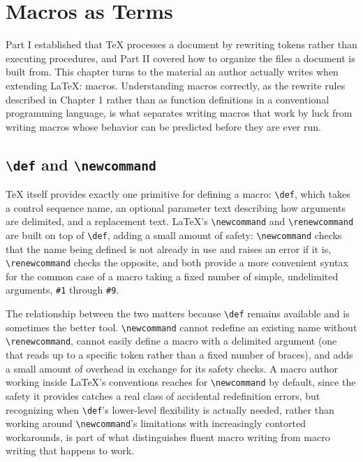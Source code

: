 \hypertarget{chapter-6-macros-as-terms}{%
\chapter{Macros as Terms}\label{chapter-6-macros-as-terms}}

Part I established that TeX processes a document by rewriting tokens rather than executing procedures, and Part II covered how to organize the files a document is built from. This chapter turns to the material an author actually writes when extending LaTeX: macros. Understanding macros correctly, as the rewrite rules described in Chapter 1 rather than as function definitions in a conventional programming language, is what separates writing macros that work by luck from writing macros whose behavior can be predicted before they are ever run.

\hypertarget{def-and-newcommand}{%
\section{\texorpdfstring{\texttt{\textbackslash{}def} and \texttt{\textbackslash{}newcommand}}{\textbackslash def and \textbackslash newcommand}}\label{def-and-newcommand}}

TeX itself provides exactly one primitive for defining a macro: \texttt{\textbackslash{}def}, which takes a control sequence name, an optional parameter text describing how arguments are delimited, and a replacement text. LaTeX's \texttt{\textbackslash{}newcommand} and \texttt{\textbackslash{}renewcommand} are built on top of \texttt{\textbackslash{}def}, adding a small amount of safety: \texttt{\textbackslash{}newcommand} checks that the name being defined is not already in use and raises an error if it is, \texttt{\textbackslash{}renewcommand} checks the opposite, and both provide a more convenient syntax for the common case of a macro taking a fixed number of simple, undelimited arguments, \texttt{\#1} through \texttt{\#9}.

The relationship between the two matters because \texttt{\textbackslash{}def} remains available and is sometimes the better tool. \texttt{\textbackslash{}newcommand} cannot redefine an existing name without \texttt{\textbackslash{}renewcommand}, cannot easily define a macro with a delimited argument (one that reads up to a specific token rather than a fixed number of braces), and adds a small amount of overhead in exchange for its safety checks. A macro author working inside LaTeX's conventions reaches for \texttt{\textbackslash{}newcommand} by default, since the safety it provides catches a real class of accidental redefinition errors, but recognizing when \texttt{\textbackslash{}def}'s lower-level flexibility is actually needed, rather than working around \texttt{\textbackslash{}newcommand}'s limitations with increasingly contorted workarounds, is part of what distinguishes fluent macro writing from macro writing that happens to work.

